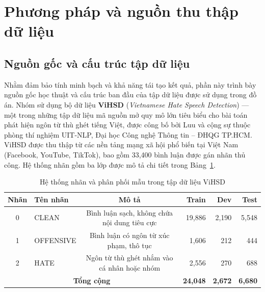 \section{Phương pháp và nguồn thu thập dữ liệu}
\label{sec:data_preprocessing}

\subsection{Nguồn gốc và cấu trúc tập dữ liệu}
Nhằm đảm bảo tính minh bạch và khả năng tái tạo kết quả, phần này trình bày nguồn gốc học thuật và cấu trúc ban đầu của tập dữ liệu được sử dụng trong đồ án.
Nhóm sử dụng bộ dữ liệu \textbf{ViHSD} (\textit{Vietnamese Hate Speech Detection}) — một trong những tập dữ liệu mã nguồn mở quy mô lớn tiêu biểu cho bài toán phát hiện ngôn từ thù ghét tiếng Việt, được công bố bởi Luu và cộng sự \cite{10.1007/978-3-030-79457-6_35} thuộc phòng thí nghiệm UIT-NLP, Đại học Công nghệ Thông tin -- ĐHQG TP.HCM.
ViHSD được thu thập từ các nền tảng mạng xã hội phổ biến tại Việt Nam (Facebook, YouTube, TikTok), bao gồm 33,400 bình luận được gán nhãn thủ công. Hệ thống nhãn gồm ba lớp được mô tả chi tiết trong Bảng~\ref{tab:vihsd_labels}.

\begin{table}[H]
    \centering
    \caption{Hệ thống nhãn và phân phối mẫu trong tập dữ liệu ViHSD}
    \label{tab:vihsd_labels}
    \begin{tabular}{clcrrr}
        \hline
        \textbf{Nhãn}                          & \textbf{Tên nhãn} & \textbf{Mô tả}                               & \textbf{Train} & \textbf{Dev} & \textbf{Test} \\
        \hline
        0                                      & CLEAN             & Bình luận sạch, không chứa nội dung tiêu cực & 19,886         & 2,190        & 5,548         \\
        1                                      & OFFENSIVE         & Bình luận có ngôn từ xúc phạm, thô tục       & 1,606          & 212          & 444           \\
        2                                      & HATE              & Ngôn từ thù ghét nhắm vào cá nhân hoặc nhóm  & 2,556          & 270          & 688           \\
        \hline
        \multicolumn{3}{c}{\textbf{Tổng cộng}} & \textbf{24,048}   & \textbf{2,672}                               & \textbf{6,680}                                \\
        \hline
    \end{tabular}
\end{table}

